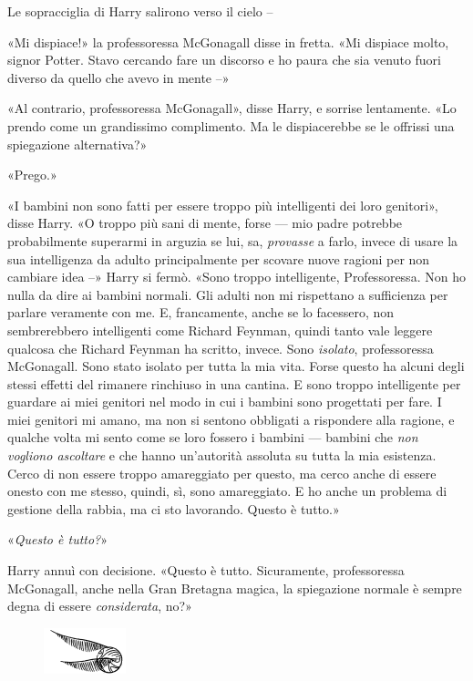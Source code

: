 Le sopracciglia di Harry salirono verso il cielo –

«Mi dispiace!» la professoressa McGonagall disse in fretta. «Mi dispiace molto, signor Potter. Stavo cercando fare un discorso e ho paura che sia venuto fuori diverso da quello che avevo in mente –»

«Al contrario, professoressa McGonagall», disse Harry, e sorrise lentamente. «Lo prendo come un grandissimo complimento. Ma le dispiacerebbe se le offrissi una spiegazione alternativa?»

«Prego.»

«I bambini non sono fatti per essere troppo più intelligenti dei loro genitori», disse Harry. «O troppo più sani di mente, forse — mio padre potrebbe probabilmente superarmi in arguzia se lui, sa, \textit{provasse} a farlo, invece di usare la sua intelligenza da adulto principalmente per scovare nuove ragioni per non cambiare idea –» Harry si fermò. «Sono troppo intelligente, Professoressa. Non ho nulla da dire ai bambini normali. Gli adulti non mi rispettano a sufficienza per parlare veramente con me. E, francamente, anche se lo facessero, non sembrerebbero intelligenti come Richard Feynman, quindi tanto vale leggere qualcosa che Richard Feynman ha scritto, invece. Sono \textit{isolato}, professoressa McGonagall. Sono stato isolato per tutta la mia vita. Forse questo ha alcuni degli stessi effetti del rimanere rinchiuso in una cantina. E sono troppo intelligente per guardare ai miei genitori nel modo in cui i bambini sono progettati per fare. I miei genitori mi amano, ma non si sentono obbligati a rispondere alla ragione, e qualche volta mi sento come se loro fossero i bambini — bambini che \textit{non vogliono ascoltare} e che hanno un’autorità assoluta su tutta la mia esistenza. Cerco di non essere troppo amareggiato per questo, ma cerco anche di essere onesto con me stesso, quindi, sì, sono amareggiato. E ho anche un problema di gestione della rabbia, ma ci sto lavorando. Questo è tutto.»

«\textit{Questo è tutto?}»

Harry annuì con decisione. «Questo è tutto. Sicuramente, professoressa McGonagall, anche nella Gran Bretagna magica, la spiegazione normale è sempre degna di essere \textit{considerata}, no?»

\begin{figure}[h]
	\includegraphics[scale=0.4]{boccino.png}
	\centering
\end{figure}

